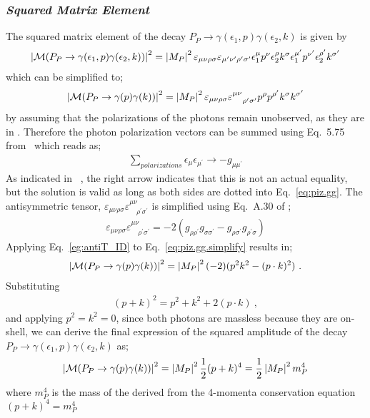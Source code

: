 \subsubsection{\emph{Squared Matrix Element}}\label{subsec:etaPMartix}
The squared matrix element of the decay $P_P \to \gamma(\epsilon_1,p) \gamma(\epsilon_2,k)$ is given by
\begin{align}\label{eq:piz.gg}
\left|{\cal  M}(P_{P}\rightarrow\gamma(\epsilon_{1},p)\gamma(\epsilon_{2},k))\right|^{2}=\left|M_{P}\right|^{2}\varepsilon_{\mu\nu\rho\sigma}\varepsilon_{\mu^{\prime}\nu^{\prime}\rho^{\prime}\sigma^{\prime}}\epsilon_{1}^{\mu}p^{\nu}\epsilon_{2}^{\rho}k^{\sigma}\epsilon_{1}^{\mu^{\prime}}p^{\nu^{\prime}}\epsilon_{2}^{\rho^{\prime}}k^{\sigma^{\prime}}
%
\end{align}
which can be simplified to;
\begin{align}\label{eq:piz.gg.simplify}
\left|{\cal M}(P_{P}\to\gamma(p)\gamma(k))\right|^{2}=\left|M_{P}\right|^{2}\varepsilon_{\mu\nu\rho\sigma}\varepsilon^{\mu\nu}_{\quad \rho^{\prime}\sigma^{\prime}}p^{\rho}p^{\rho^{\prime}}k^{\sigma}k^{\sigma^{\prime}}
%
\end{align}
by assuming that the polarizations of the photons remain unobserved, as they are in . Therefore the photon polarization vectors can be summed using Eq.~5.75 from~\cite{peskin} which reads as;
\begin{align}
\sum\limits_{polarizations} \epsilon_{\mu} \epsilon_{\mu^{\prime}} \to -g_{\mu\mu^{\prime}} 
\end{align}
As indicated in ~\cite{peskin}, the right arrow indicates that this is not an actual equality, but the solution is valid as long as both sides are dotted into Eq.~\ref{eq:piz.gg}. The antisymmetric tensor, $\varepsilon_{\mu\nu\rho\sigma}\varepsilon^{\mu\nu}_{\quad \rho^{\prime}\sigma^{\prime}}$ is simplified using  Eq.~A.30 of \cite{peskin}; 
\begin{align}\label{eg:antiT_ID}
\varepsilon_{\mu\nu\rho\sigma}\varepsilon^{\mu\nu}_{\quad \rho^{\prime}\sigma^{\prime}} = -2(g_{\rho\rho^{\prime}}g_{\sigma\sigma^{\prime}} - g_{\rho\sigma^{\prime}}g_{\rho^{\prime}\sigma})
\end{align}
Applying Eq.~\ref{eg:antiT_ID} to Eq.~\ref{eq:piz.gg.simplify} results in;
\begin{align}\label{eq:piz.gg.reduced}
\left|{\cal M}(P_{P}\to\gamma(p)\gamma(k))\right|^{2}=\left|M_{P}\right|^{2}(-2)(p^2k^2 - (p\cdot k)^2) \ .
%
\end{align}
Substituting
\begin{align}
(p + k)^2 = p^2 + k^2 +2 (p\cdot k) \ ,
\end{align}
and applying $p^2= k^2=0$, since both photons are massless because they are on-shell, we can derive the final expression of the squared amplitude of the decay $P_P \to \gamma(\epsilon_1,p) \gamma(\epsilon_2,k)$ as;
\begin{align}\label{eq:piz_gg_amp_final}
\left|{\cal M}(P_{P}\to\gamma(p)\gamma(k))\right|^{2}= \left|M_{P}\right|^{2}\frac{1}{2}(p+k)^{4} = \frac{1}{2}\left|M_{P}\right|^{2}m_{P}^{4}
\end{align}
where $m_P^4$ is the mass of the \etaTP derived from the 4-momenta conservation equation $(p+k)^4 = m_P^4$
